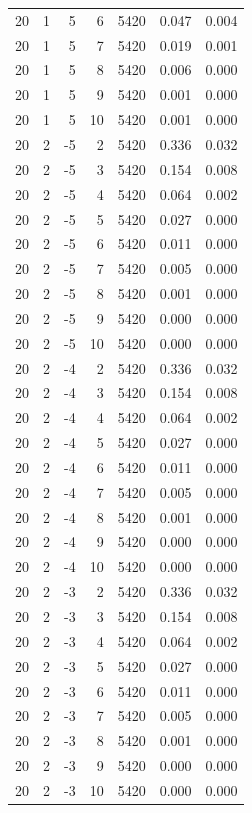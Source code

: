 \begin{table}
\begin{tabular}{rrrrrrr}
20 & 1 & 5 & 6 & 5420 & 0.047 & 0.004 \\
20 & 1 & 5 & 7 & 5420 & 0.019 & 0.001 \\
20 & 1 & 5 & 8 & 5420 & 0.006 & 0.000 \\
20 & 1 & 5 & 9 & 5420 & 0.001 & 0.000 \\
20 & 1 & 5 & 10 & 5420 & 0.001 & 0.000 \\
20 & 2 & -5 & 2 & 5420 & 0.336 & 0.032 \\
20 & 2 & -5 & 3 & 5420 & 0.154 & 0.008 \\
20 & 2 & -5 & 4 & 5420 & 0.064 & 0.002 \\
20 & 2 & -5 & 5 & 5420 & 0.027 & 0.000 \\
20 & 2 & -5 & 6 & 5420 & 0.011 & 0.000 \\
20 & 2 & -5 & 7 & 5420 & 0.005 & 0.000 \\
20 & 2 & -5 & 8 & 5420 & 0.001 & 0.000 \\
20 & 2 & -5 & 9 & 5420 & 0.000 & 0.000 \\
20 & 2 & -5 & 10 & 5420 & 0.000 & 0.000 \\
20 & 2 & -4 & 2 & 5420 & 0.336 & 0.032 \\
20 & 2 & -4 & 3 & 5420 & 0.154 & 0.008 \\
20 & 2 & -4 & 4 & 5420 & 0.064 & 0.002 \\
20 & 2 & -4 & 5 & 5420 & 0.027 & 0.000 \\
20 & 2 & -4 & 6 & 5420 & 0.011 & 0.000 \\
20 & 2 & -4 & 7 & 5420 & 0.005 & 0.000 \\
20 & 2 & -4 & 8 & 5420 & 0.001 & 0.000 \\
20 & 2 & -4 & 9 & 5420 & 0.000 & 0.000 \\
20 & 2 & -4 & 10 & 5420 & 0.000 & 0.000 \\
20 & 2 & -3 & 2 & 5420 & 0.336 & 0.032 \\
20 & 2 & -3 & 3 & 5420 & 0.154 & 0.008 \\
20 & 2 & -3 & 4 & 5420 & 0.064 & 0.002 \\
20 & 2 & -3 & 5 & 5420 & 0.027 & 0.000 \\
20 & 2 & -3 & 6 & 5420 & 0.011 & 0.000 \\
20 & 2 & -3 & 7 & 5420 & 0.005 & 0.000 \\
20 & 2 & -3 & 8 & 5420 & 0.001 & 0.000 \\
20 & 2 & -3 & 9 & 5420 & 0.000 & 0.000 \\
20 & 2 & -3 & 10 & 5420 & 0.000 & 0.000 \\

\end{tabular}
\end{table}
